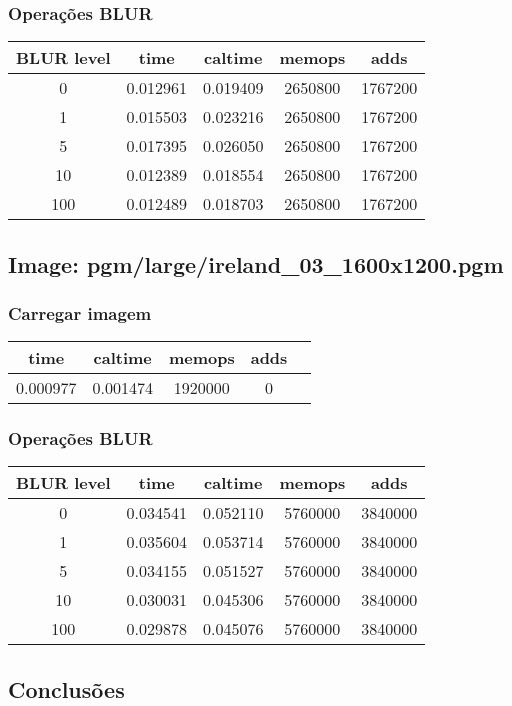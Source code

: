 \documentclass{report}
\begin{document}
\subsubsection*{Operações BLUR}
\begin{tabular}{ccccc}
\toprule
\textbf{BLUR level} & \textbf{time} & \textbf{caltime} & \textbf{memops} & \textbf{adds} \\
\midrule
0 & 0.012961 & 0.019409 & 2650800 & 1767200 \\
1 & 0.015503 & 0.023216 & 2650800 & 1767200 \\
5 & 0.017395 & 0.026050 & 2650800 & 1767200 \\
10 & 0.012389 & 0.018554 & 2650800 & 1767200 \\
100 & 0.012489 & 0.018703 & 2650800 & 1767200 \\
\bottomrule
\end{tabular}

\subsection*{Image: pgm/large/ireland\_03\_1600x1200.pgm}

\subsubsection*{Carregar imagem}
\begin{tabular}{ccccc}
\toprule
\textbf{time} & \textbf{caltime} & \textbf{memops} & \textbf{adds} \\
\midrule
0.000977 & 0.001474 & 1920000 & 0 \\
\bottomrule
\end{tabular}

\subsubsection*{Operações BLUR}
\begin{tabular}{ccccc}
\toprule
\textbf{BLUR level} & \textbf{time} & \textbf{caltime} & \textbf{memops} & \textbf{adds} \\
\midrule
0 & 0.034541 & 0.052110 & 5760000 & 3840000 \\
1 & 0.035604 & 0.053714 & 5760000 & 3840000 \\
5 & 0.034155 & 0.051527 & 5760000 & 3840000 \\
10 & 0.030031 & 0.045306 & 5760000 & 3840000 \\
100 & 0.029878 & 0.045076 & 5760000 & 3840000 \\
\bottomrule
\end{tabular}

\subsection{Conclusões}







\printbibliography
\end{document}
